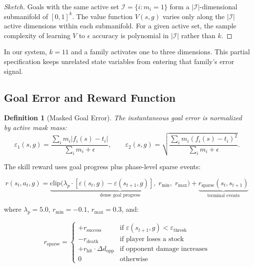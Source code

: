 \documentclass[11pt,a4paper]{article}
\newtheorem{definition}{Definition}
\begin{document}
\begin{proof}[Sketch]
Goals with the same active set $\mathcal{I} = \{i : m_i = 1\}$ form a $|\mathcal{I}|$-dimensional submanifold of $[0,1]^k$.
The value function $V(s, g)$ varies only along the $|\mathcal{I}|$ active dimensions within each submanifold.
For a given active set, the sample complexity of learning $V$ to $\epsilon$ accuracy is polynomial in $|\mathcal{I}|$ rather than $k$.
\end{proof}

In our system, $k = 11$ and a family activates one to three dimensions. This partial
specification keeps unrelated state variables from entering that family's error signal.

\subsection{Goal Error and Reward Function}
\label{sec:reward}

\begin{definition}[Masked Goal Error]
The instantaneous goal error is normalized by active mask mass:
\begin{equation}
\varepsilon_1(s,g)=\frac{\sum_i m_i|f_i(s)-t_i|}{\sum_i m_i+\epsilon},
\qquad
\varepsilon_2(s,g)=\sqrt{\frac{\sum_i m_i(f_i(s)-t_i)^2}{\sum_i m_i+\epsilon}}.
\label{eq:goal-error}
\end{equation}
\end{definition}

The skill reward uses goal progress plus phase-level sparse events:

\begin{equation}
\boxed{
r(s_t, a_t, g) = \underbrace{\text{clip}\bigl(\lambda_p \cdot [\varepsilon(s_t, g) - \varepsilon(s_{t+1}, g)],\; r_{\min},\; r_{\max}\bigr)}_{\text{dense goal progress}} + \underbrace{r_{\text{sparse}}(s_t, s_{t+1})}_{\text{terminal events}}
}
\label{eq:llc-reward}
\end{equation}

where $\lambda_p = 5.0$, $r_{\min} = -0.1$, $r_{\max} = 0.3$, and:

\begin{equation}
r_{\text{sparse}} = \begin{cases}
    +r_{\text{success}} & \text{if } \varepsilon(s_{t+1}, g) < \varepsilon_{\text{thresh}} \\[3pt]
    -r_{\text{death}} & \text{if player loses a stock} \\[3pt]
    +r_{\text{hit}} \cdot \Delta d_{\text{opp}} & \text{if opponent damage increases} \\[3pt]
    0 & \text{otherwise}
\end{cases}
\end{equation}
\end{document}
